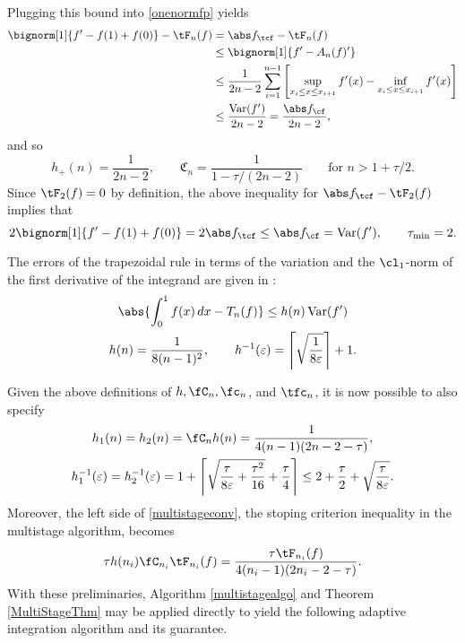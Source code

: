 Plugging this bound into \eqref{onenormfp} yields
\begin{align*}
\bignorm[1]{f'-f(1)+f(0)} - \tF_n(f) &= \Ftnorm{f} - \tF_{n}(f)\\
 & \le \bignorm[1]{f' -A_n(f)'}\\
&\le \frac{1}{2n-2} \sum_{i=1}^{n-1} \left[ \sup_{x_i \le x \le x_{i+1}} f'(x) - \inf_{x_i \le x \le x_{i+1}} f'(x) \right] \\
& \le \frac{\Var(f')}{2n-2} = \frac{\Fnorm{f}}{2n-2},
\end{align*}
and so 
\begin{equation*}\label{factor}
h_{+}(n)= \frac{1}{2n-2}, \qquad \mathfrak{C}_n =\frac{1}{1 - \tau/(2n-2)} \qquad \text{for } n>1+\tau/2.
\end{equation*}
Since $\tF_2(f)=0$ by definition, the above inequality for $\Ftnorm{f} - \tF_{2}(f)$ implies that
\begin{equation*} \label{taumininteg}
2\bignorm[1]{f'-f(1)+f(0)} = 2 \Ftnorm{f} \le \Fnorm{f} = \Var(f'), \qquad \tau_{\min}=2.
\end{equation*}

The errors of the trapezoidal rule in terms of the variation and the $\cl_1$-norm of the first derivative of the integrand are given in \cite[(7.15)???]{BraPet11a}:
\begin{gather*}
\abs{\int_0^1 f(x) \, dx - T_n(f)} \le h(n) \Var(f') \\
h(n)= \frac{1}{8(n-1)^2}, \qquad h^{-1}(\varepsilon) = \left \lceil \sqrt{\frac{1}{8\varepsilon}} \right \rceil +1.
\end{gather*}

Given the above definitions of $h, \fC_n, \fc_n$, and $\tfc_n$, it is now possible to also specify
\begin{gather*}
h_1(n) = h_2(n) = \fC_n h(n) = \frac{1}{4(n-1)(2n-2-\tau)}, \\
h_1^{-1}(\varepsilon) = h_2^{-1}(\varepsilon) = 1+ \left \lceil \sqrt{\frac{\tau}{8 \varepsilon} + \frac{\tau^2}{16}} +\frac{\tau}{4} \right \rceil \le 2 + \frac{\tau}{2} + \sqrt{\frac{\tau}{8\varepsilon}}.
\end{gather*}
Moreover, the left side of \eqref{multistageconv}, the stoping criterion inequality in the multistage algorithm, becomes
\begin{equation*}
\tau h(n_i)\fC_{n_i} \tF_{n_i}(f) = \frac{\tau  \tF_{n_i}(f) } {4(n_i-1)(2n_i-2 -\tau)}.
\end{equation*}
With these preliminaries, Algorithm \ref{multistagealgo} and Theorem \ref{MultiStageThm} may be applied directly to  yield the following adaptive integration algorithm and its guarantee.

